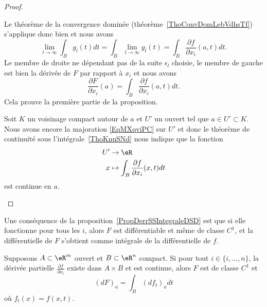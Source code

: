 \begin{proof}
\begin{subproof}
		Le théorème de la convergence dominée (théorème~\ref{ThoConvDomLebVdhsTf}) s'applique donc bien et nous avons
		\begin{equation}
			\lim_{l\to \infty} \int_Bg_l(t)dt=\int_B\lim_{l\to \infty} g_l(t)=\int_B\frac{ \partial f }{ \partial x_i }(a,t)dt.
		\end{equation}
		Le membre de droite ne dépendant pas de la suite \( \epsilon_l\) choisie, le membre de gauche est bien la dérivée de \( F\) par rapport à \( x_i\) et nous avons
		\begin{equation}
			\frac{ \partial F }{ \partial x_i }(a)=\int_B\frac{ \partial f }{ \partial x_i }(a,t)dt.
		\end{equation}
		Cela prouve la première partie de la proposition.

		Soit \( K\) un voisinage compact autour de \( a\) et \( U'\) un ouvert tel que \( a\in U'\subset K\). Nous avons encore la majoration \eqref{EqMXqviPC} sur \( U'\) et donc le théorème de continuité sous l'intégrale~\ref{ThoKnuSNd} nous indique que la fonction
		\begin{equation}
			\begin{aligned}
				U' & \to \eR                                                    \\
				x  & \mapsto \int_{B}\frac{ \partial f }{ \partial x_i }(x,t)dt
			\end{aligned}
		\end{equation}
		est continue en \( a\).

	\end{subproof}
\end{proof}

Une conséquence de la proposition~\ref{PropDerrSSIntegraleDSD} est que si elle fonctionne pour tous les \( i\), alors \( F\) est différentiable et même de classe \( C^1\), et la différentielle de \( F\) s'obtient comme intégrale de la différentielle de \( f\).

\begin{proposition}\label{PropAOZkDsh}
	Supposons \( A\subset\eR^m\) ouvert et \( B\subset\eR^n\) compact. Si pour tout \( i\in\{ i,\ldots,n \}\), la dérivée partielle \( \frac{ \partial f }{ \partial x_i }\) existe dans \( A\times B\) et est continue, alors \( F\) est de classe \( C^1\) et
	\begin{equation}
		(dF)_a=\int_B(df_t)_adt
	\end{equation}
	où \( f_t(x)=f(x,t)\).
\end{proposition}

